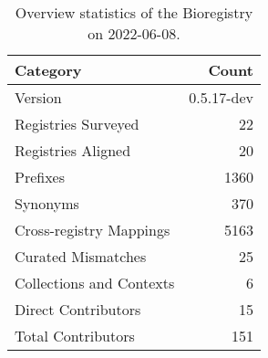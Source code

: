 \begin{table}
\centering
\caption{Overview statistics of the Bioregistry on 2022-06-08.}
\label{tab:bioregistry-summary}
\begin{tabular}{lr}
\toprule
                Category &      Count \\
\midrule
                 Version & 0.5.17-dev \\
     Registries Surveyed &         22 \\
      Registries Aligned &         20 \\
                Prefixes &       1360 \\
                Synonyms &        370 \\
 Cross-registry Mappings &       5163 \\
      Curated Mismatches &         25 \\
Collections and Contexts &          6 \\
     Direct Contributors &         15 \\
      Total Contributors &        151 \\
\bottomrule
\end{tabular}
\end{table}
